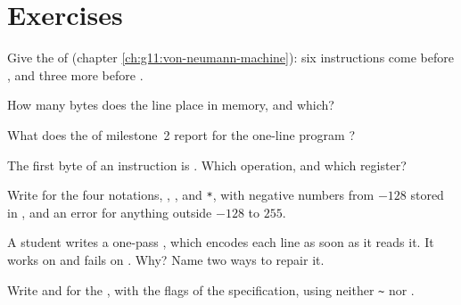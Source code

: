 \section{Exercises}\label{sec:g11:project-toy-machine:exercises}

\begin{exercise}[$\star$]\label{exo:g11:project-toy-machine:1}
Give the  of  (chapter \ref{ch:g11:von-neumann-machine}): six instructions come before
, and three more before .
\end{exercise}

\begin{exercise}[$\star$]\label{exo:g11:project-toy-machine:2}
How many bytes does the line  place in memory, and which?
\end{exercise}

\begin{exercise}[$\star$]\label{exo:g11:project-toy-machine:3}
What does the  of milestone~2 report for the one-line program ?
\end{exercise}

\begin{exercise}[$\star$]\label{exo:g11:project-toy-machine:4}
The first byte of an instruction is . Which operation, and which register?
\end{exercise}

\begin{exercise}[$\star$]\label{exo:g11:project-toy-machine:5}
Write  for the four notations, , ,  and \texttt{\textquotesingle{}*\textquotesingle{}}, with
negative numbers from $-128$ stored in , and an error for anything outside $-128$ to $255$.
\end{exercise}

\begin{exercise}[$\star\star$]\label{exo:g11:project-toy-machine:6}
A student writes a one-pass , which encodes each line as soon as it reads it. It works on
 and fails on . Why? Name two ways to repair it.
\end{exercise}

\begin{exercise}[$\star\star$]\label{exo:g11:project-toy-machine:7}
Write  and  for the , with the flags of the specification, using
neither \texttt{\textasciitilde} nor \code{>>}.
\end{exercise}


